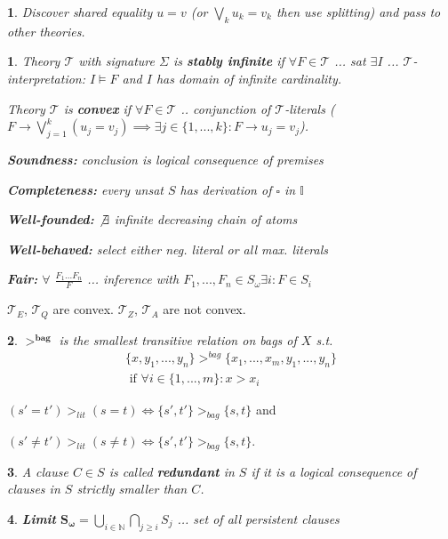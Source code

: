 \documentclass[9pt]{extarticle}
\theoremstyle{theoremstyle}
\newtheorem*{green}{}
\newtheorem*{blue}{}
\begin{document}
\begin{multicols}{3}
\begin{minipage}[t]{.30\textwidth}
\begin{blue}
Discover shared equality $u=v$ (or $\bigvee_k u_k = v_k$ then use splitting) and pass to other theories.
\end{blue}

\begin{green}
Theory $\mathcal{T}$ with signature $\Sigma$ is \textbf{stably infinite} if $\forall F \in \mathcal{T}$ ... sat $\exists I$ ... $\mathcal{T}$-interpretation: $I \models F$ and $I$ has domain of infinite cardinality.

Theory $\mathcal{T}$ is \textbf{convex} if $\forall F \in \mathcal{T}$ .. conjunction of $\mathcal{T}$-literals ($F \rightarrow \bigvee_{j=1}^k(u_j = v_j) \implies \exists j\in\{1,...,k\}: F \rightarrow u_j = v_j$).

\textbf{Soundness:} conclusion is logical consequence of premises

\textbf{Completeness:} every unsat $S$ has derivation of $\square$ in $\mathbb{I}$

\textbf{Well-founded:} $\not\exists$ infinite decreasing chain of atoms

\textbf{Well-behaved:} select either neg. literal or all max. literals

\textbf{Fair:} $\forall$ $\frac{F_1...F_n}{F}$ ... inference with $F_1,...,F_n \in S_\omega \exists i: F \in S_i$
\end{green}

$\mathcal{T}_E$, $\mathcal{T}_Q$ are convex. $\mathcal{T}_Z$, $\mathcal{T}_A$ are not convex.

\begin{green}
$\mathbf{>^{bag}}$ is the smallest transitive relation on bags of $X$ s.t.
\begin{align*}
	\{x,y_1,...,y_n\} >^{bag} \{x_1,...,x_m,y_1,...,y_n\}\\
	\text{ if } \forall i\in\{1,...,m\}: x>x_i
\end{align*}
\end{green}

$(s' = t') >_{lit} (s=t) \iff \{s',t'\}>_{bag}\{s,t\}$ and

$(s' \not= t') >_{lit} (s\not=t) \iff \{s',t'\}>_{bag}\{s,t\}$.

\begin{green}
A clause $C \in S$ is called \textbf{redundant} in $S$ if it is a logical consequence of clauses in $S$ strictly smaller than $C$.
\end{green}


\begin{green}
	\textbf{Limit} $\mathbf{S_\omega} = \bigcup_{i\in\mathbb{N}} \bigcap_{j\geq i} S_j$ ... set of all persistent clauses
\end{green}


\end{minipage}
\end{multicols}
\end{document}
